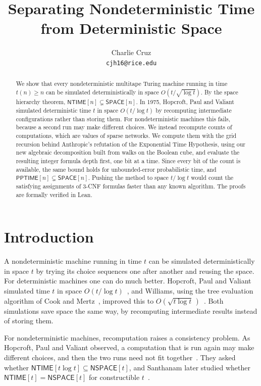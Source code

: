 \documentclass[11pt]{article}
\title{Separating Nondeterministic Time\\ from Deterministic Space}
\author{Charlie Cruz\\[2pt]\normalsize\texttt{cjh16@rice.edu}}
\date{\vspace{-2em}}
\theoremstyle{definition}
\theoremstyle{definition}
\theoremstyle{remark}
\newcommand{\NTIME}{\mathsf{NTIME}}
\newcommand{\SPACE}{\mathsf{SPACE}}
\newcommand{\NSPACE}{\mathsf{NSPACE}}
\newcommand{\PPTIME}{\mathsf{PPTIME}}
\begin{document}
\maketitle

\begin{abstract}
We show that every nondeterministic multitape Turing machine running in time $t(n)\ge n$ can be simulated deterministically in space $O(t/\sqrt{\log t})$. By the space hierarchy theorem, $\NTIME[n]\subsetneq\SPACE[n]$.
In 1975, Hopcroft, Paul and Valiant simulated deterministic time $t$ in space $O(t/\log t)$ by recomputing intermediate configurations rather than storing them. For nondeterministic machines this fails, because a second run may make different choices. We instead recompute counts of computations, which are values of sparse networks. We compute them with the grid recursion behind Anthropic's refutation of the Exponential Time Hypothesis, using our new algebraic decomposition built from walks on the Boolean cube, and evaluate the resulting integer formula depth first, one bit at a time. Since every bit of the count is available, the same bound holds for unbounded-error probabilistic time, and $\PPTIME[n]\subsetneq\SPACE[n]$. Pushing the method to space $t/\log t$ would count the satisfying assignments of $3$-CNF formulas faster than any known algorithm. The proofs are formally verified in Lean.
\end{abstract}

\section{Introduction}

A nondeterministic machine running in time $t$ can be simulated deterministically in space $t$ by trying its choice sequences one after another and reusing the space. For deterministic machines one can do much better. Hopcroft, Paul and Valiant simulated time $t$ in space $O(t/\log t)$~\cite{HPV77}, and Williams, using the tree evaluation algorithm of Cook and Mertz~\cite{CM24}, improved this to $O(\sqrt{t\log t}\,)$~\cite{Wil25}. Both simulations save space the same way, by recomputing intermediate results instead of storing them.

For nondeterministic machines, recomputation raises a consistency problem. As Hopcroft, Paul and Valiant observed, a computation that is run again may make different choices, and then the two runs need not fit together~\cite[\S2]{HPV75}. They asked whether $\NTIME[t\log t]\subseteq\NSPACE[t]$, and Santhanam later studied whether $\NTIME[t]=\NSPACE[t]$ for constructible $t$~\cite{San01}.
\end{document}
